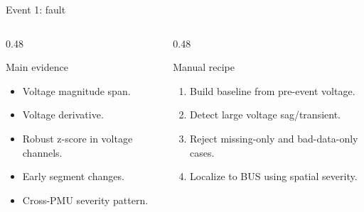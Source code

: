 \documentclass[10pt,aspectratio=169]{beamer}
\begin{document}
\begin{frame}{Event 1: fault}
\small
\begin{columns}[T,totalwidth=\textwidth]
\begin{column}{0.48\textwidth}
\begin{block}{Main evidence}
\begin{itemize}
  \item Voltage magnitude span.
  \item Voltage derivative.
  \item Robust z-score in voltage channels.
  \item Early segment changes.
  \item Cross-PMU severity pattern.
\end{itemize}
\end{block}
\end{column}
\begin{column}{0.48\textwidth}
\begin{alertblock}{Manual recipe}
\begin{enumerate}
  \item Build baseline from pre-event voltage.
  \item Detect large voltage sag/transient.
  \item Reject missing-only and bad-data-only cases.
  \item Localize to BUS using spatial severity.
\end{enumerate}
\end{alertblock}
\end{column}
\end{columns}
\end{frame}
\end{document}
